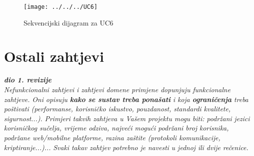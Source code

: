				     
				     
				      \begin{figure}[hbt!]
				      	\centering
				      	\texttt{[image: ../../../UC6]}
				      	\caption{Sekvencijski dijagram za UC6}
				      	\label{fig:uc6}
				      \end{figure}
				      
				    
				    
				    
		   	\eject
	
		\section{Ostali zahtjevi}
		
			\textbf{\textit{dio 1. revizije}}\\
		 
			 \textit{Nefunkcionalni zahtjevi i zahtjevi domene primjene dopunjuju funkcionalne zahtjeve. Oni opisuju \textbf{kako se sustav treba ponašati} i koja \textbf{ograničenja} treba poštivati (performanse, korisničko iskustvo, pouzdanost, standardi kvalitete, sigurnost...). Primjeri takvih zahtjeva u Vašem projektu mogu biti: podržani jezici korisničkog sučelja, vrijeme odziva, najveći mogući podržani broj korisnika, podržane web/mobilne platforme, razina zaštite (protokoli komunikacije, kriptiranje...)... Svaki takav zahtjev potrebno je navesti u jednoj ili dvije rečenice.}
			 
			 
			 
	